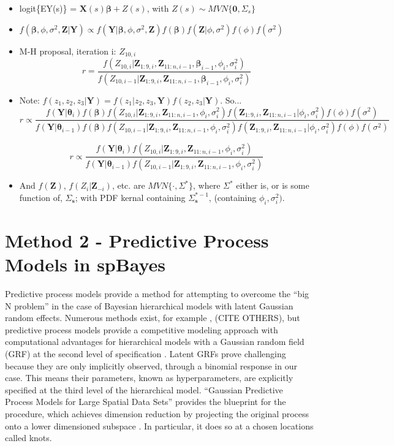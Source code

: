 \documentclass{article}
\begin{document}
\begin{itemize}
\item logit\{EY(s)\} = $\pmb{X}(s)\pmb{\beta} + Z(s)$, with $Z(s) \sim MVN\{\pmb{0}, \Sigma_{s}\}$
\item $f(\pmb{\beta}, \phi, \sigma^{2}, \pmb{Z}|\pmb{Y}) \propto f(\pmb{Y}|\pmb{\beta}, \phi, \sigma^{2}, \pmb{Z})f(\pmb{\beta})f(\pmb{Z}|\phi, \sigma^{2})f(\phi)f(\sigma^{2})$
\item M-H proposal, iteration i: $Z_{10,i}$
$$ r = \frac{ f(Z_{10,i}|\pmb{Z}_{1:9,i},\pmb{Z}_{11:n,i-1}, \pmb{\beta}_{i-1}, \phi_{i}, \sigma^{2}_{i})}{f(Z_{10,i-1}|\pmb{Z}_{1:9,i},\pmb{Z}_{11:n,i-1}, \pmb{\beta}_{i-1}, \phi_{i}, \sigma^{2}_{i})} $$
 
\item Note: $f(z_{1}, z_{2}, z_{3}|\pmb{Y}) = f(z_{1}|z_{2},z_{3},\pmb{Y})f(z_{2},z_{3}|\pmb{Y})$. So... $$r \propto \frac{f(\pmb{Y}|\pmb{\theta}_{i})f(\pmb{\beta})f(Z_{10,i}|\pmb{Z}_{1:9,i},\pmb{Z}_{11:n,i-1}, \phi_{i}, \sigma^{2}_{i})f(\pmb{Z}_{1:9,i},\pmb{Z}_{11:n,i-1}|\phi_{i}, \sigma^{2}_{i})f(\phi)f(\sigma^{2})} {f(\pmb{Y}|\pmb{\theta}_{i-1})f(\pmb{\beta})f(Z_{10,i-1}|\pmb{Z}_{1:9,i},\pmb{Z}_{11:n,i-1}, \phi_{i}, \sigma^{2}_{i})f(\pmb{Z}_{1:9,i},\pmb{Z}_{11:n,i-1}|\phi_{i}, \sigma^{2}_{i})f(\phi)f(\sigma^{2})}$$

$$ r \propto \frac{f(\pmb{Y}|\pmb{\theta}_{i})f(Z_{10,i}|\pmb{Z}_{1:9,i},\pmb{Z}_{11:n,i-1}, \phi_{i}, \sigma^{2}_{i})}
{f(\pmb{Y}|\pmb{\theta}_{i-1})f(Z_{10,i-1}|\pmb{Z}_{1:9,i},\pmb{Z}_{11:n,i-1}, \phi_{i}, \sigma^{2}_{i})} $$

\item And $f(\pmb{Z})$, $f(Z_{i}|\pmb{Z}_{-i})$, etc. are $MVN\{\cdot,\Sigma^{*}\}$, where $\Sigma^{*}$ either is, or is some function of, $\Sigma_{\pmb{s}}$; with PDF kernal containing $\Sigma_{\pmb{s}}^{*-1}$, (containing $\phi_{i}, \sigma^{2}_{i})$.

\end{itemize}

\section{Method 2 - Predictive Process Models in spBayes} %

Predictive process models provide a method for attempting to overcome the ``big N problem'' in the case of Bayesian hierarchical models with latent Gaussian random effects. Numerous methods exist, for example \citep{Cressie2008}, (CITE OTHERS), but predictive process models provide a competitive modeling approach with computational advantages for hierarchical models with a Gaussian random field (GRF) at the second level of specification \citep{Banerjee2008}. Latent GRFs prove challenging because they are only implicitly observed, through a binomial response in our case. This means their parameters, known as hyperparameters, are explicitly specified at the third level of the hierarchical model. ``Gaussian Predictive Process Models for Large Spatial Data Sets'' provides the blueprint for the procedure, which achieves dimension reduction by projecting the original process onto a lower dimensioned subspace \citep{Banerjee2008}. In particular, it does so at a chosen locations called knots. 
\end{document}
